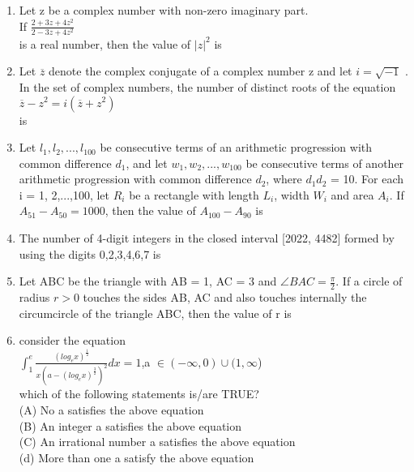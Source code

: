 \documentclass{article}
\begin{document}
\begin{enumerate}
	\item Let z be a complex number with non-zero imaginary part.\\
		If    $\frac{2+3z+4z^2}{2-3z+4z^2}$\\
		is a real number, then the value of $|z|^2$ is \underline{\hspace{2cm}}
 \\
\medskip
	\item Let $\overline{z}$ denote the complex conjugate of a complex number z and let $i =\sqrt{-1}$ . In the set of complex 
numbers, the number of distinct roots of the equation\\
		$\overline{z}-z^2=i(\overline{z}+z^2)$\\
		is \underline{\hspace{2cm}}\\
\medskip


	\item Let $l_1,l_2,...,l_{100}$ be consecutive terms of an arithmetic progression with common difference $d_1$, and let $w_1, w_2, ... , w_100$ be consecutive terms of another arithmetic progression with common difference $d_2 $, where $d_1d_2$ = 10. For each i = 1, 2,...,100, let $R_i$ be a rectangle with length $L_i$, width $W_i$ and area $A_i$. If $A_{51}-A_{50}=1000$, then the value of $A_{100}-A_{90}$ is \underline{\hspace{2cm}}\\
\medskip

	\item The number of 4-digit integers in the closed interval [2022, 4482] formed by using the digits 
		0,2,3,4,6,7 is\underline{\hspace{2cm}}\\
\medskip

	\item Let ABC be the triangle with AB = 1, AC = 3 and $\angle BAC=\frac{\pi}{2}$. If a circle of radius $r > 0$ touches the sides AB, AC and also touches internally the circumcircle of the triangle ABC, then the value of r is\underline{\hspace{2cm}}\\
\medskip


	\item consider the equation\\
		$\int_1^e\frac{(log_e x)^\frac{1}{2}}{x(a-(log_e x)^\frac{3}{2})^2}dx =1$,a $\in (-\infty,0)\cup(1,\infty$) \\
which of the following statements is/are TRUE?\\
		(A) No a satisfies the above equation\\
		(B) An integer a satisfies the above equation\\
		(C) An irrational number a satisfies the above equation\\
		(d) More than one a satisfy the above equation\\
\medskip


\end{enumerate}
\end{document}
